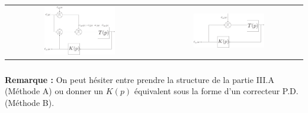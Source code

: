 \documentclass[10pt,fleqn]{article} %
\begin{document}
\begin{center}
\begin{tabular}{cc}
\includegraphics[width=0.5\textwidth]{images/DR_B_corrige2.pdf}
&
\includegraphics[width=0.5\textwidth]{images/DR_B_corrige3.pdf}
\end{tabular}
\end{center}

\subparagraph{}%

\textbf{Remarque : } On peut hésiter entre prendre la structure de la partie III.A (Méthode A) ou donner un $K(p)$ équivalent sous la forme d'un correcteur P.D. (Méthode B).
\end{document}
